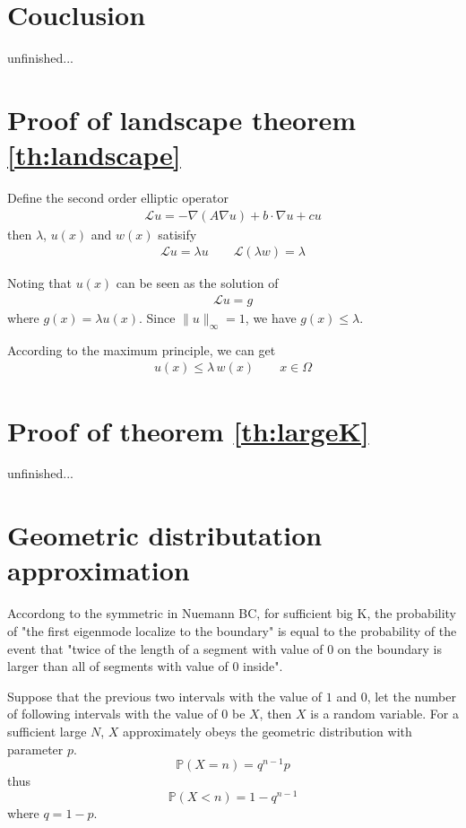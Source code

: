 \documentclass[12pt,a4paper]{article}
\begin{document}
\section{Couclusion}

{\color{red} unfinished...}

\begin{appendices}

\section{Proof of landscape theorem \ref{th:landscape}}

Define the second order elliptic operator
\begin{align*}
\mathcal{L} u = -\nabla(A \nabla u) + b \cdot \nabla u + c u
\end{align*}
then $\lambda$, $u(x)$ and $w(x)$ satisify
\begin{align*}
\mathcal{L} u = \lambda u \qquad \mathcal{L} (\lambda w) = \lambda
\end{align*}

Noting that $u(x)$ can be seen as the solution of
\begin{align*}
\mathcal{L} u = g
\end{align*}
where $g(x) = \lambda u(x)$. Since $\|u\|_{\infty} = 1$, we have $g(x) \leq \lambda$.

According to the maximum principle, we can get
\begin{align*}
u(x) \leq \lambda \, w(x) \qquad x \in \Omega
\end{align*}

\section{Proof of theorem \ref{th:largeK}}

{\color{red} unfinished...}

\section{Geometric distributation approximation}

Accordong to the symmetric in Nuemann BC, for sufficient big K, the probability of "the first eigenmode localize to the boundary" is equal to the probability of the event that "twice of the length of a segment with value of 0 on the boundary is larger than all of segments with value of 0 inside".

Suppose that the previous two intervals with the value of $1$ and $0$, let the number of following intervals with the value of $0$ be $X$, then $X$ is a random variable. For a sufficient large $N$, $X$ approximately obeys the geometric distribution with parameter $p$.
$$ \mathbb{P}(X = n) = q^{n-1} p $$
thus
$$ \mathbb{P}(X < n) = 1 - q^{n-1} $$
where $q = 1 - p$.


\end{appendices}
\end{document}
